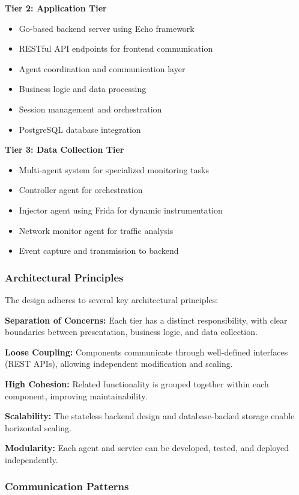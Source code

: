 \textbf{Tier 2: Application Tier}
\begin{itemize}
    \item Go-based backend server using Echo framework
    \item RESTful API endpoints for frontend communication
    \item Agent coordination and communication layer
    \item Business logic and data processing
    \item Session management and orchestration
    \item PostgreSQL database integration
\end{itemize}

\textbf{Tier 3: Data Collection Tier}
\begin{itemize}
    \item Multi-agent system for specialized monitoring tasks
    \item Controller agent for orchestration
    \item Injector agent using Frida for dynamic instrumentation
    \item Network monitor agent for traffic analysis
    \item Event capture and transmission to backend
\end{itemize}

\subsubsection{Architectural Principles}

The design adheres to several key architectural principles:

\textbf{Separation of Concerns:} Each tier has a distinct responsibility, with clear boundaries between presentation, business logic, and data collection.

\textbf{Loose Coupling:} Components communicate through well-defined interfaces (REST APIs), allowing independent modification and scaling.

\textbf{High Cohesion:} Related functionality is grouped together within each component, improving maintainability.

\textbf{Scalability:} The stateless backend design and database-backed storage enable horizontal scaling.

\textbf{Modularity:} Each agent and service can be developed, tested, and deployed independently.

\subsubsection{Communication Patterns}

